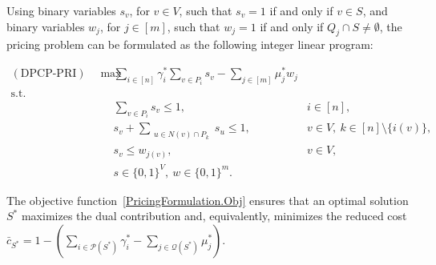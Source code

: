 \documentclass[preprint, 11pt, authoryear]{elsarticle}
\newcommand{\PP}{{\mathcal P}}
\newcommand{\QQ}{{\mathcal Q}}
\newcommand{\R}{{\mathbb R}}
\newcommand{\STAB}{{\mathscr S}}
\newcommand{\setcoveringform}{\text{DPCP-SCF}}
\newcommand{\pricingform}{\text{DPCP-PRI}}
\begin{document}

Using binary variables $s_v$, for $v \in V$, such that $s_v = 1$ if and only if $v \in S$, and binary variables $w_j$, for $j \in [m]$, such that $w_j = 1$ if and only if $Q_j \cap S \neq \emptyset$, the pricing problem can be formulated as the following integer linear program:

{\small
\begin{align}
(\pricingform) \quad \max & \sum_{i \in [n]} \gamma^*_i \sum_{v \in P_i} s_v - \sum_{j \in [m]} \mu^*_j w_j \label{PricingFormulation.Obj}\\[-4pt]
\textrm{s.t.} \nonumber \\[-4pt]
& \sum_{v \in P_i} s_v \leq 1, &  i \in [n], \label{PricingFormulation.A.clique} \\
& s_v + \sum_{\substack{u \in N(v) \cap P_k }} s_u \leq 1, &  v \in V,\ k \in [n] \setminus \{i(v)\}, \label{PricingFormulation.A.edge} \\
& s_v \leq w_{j(v)}, &  v \in V, \label{PricingFormulation.B}  \\
& s \in \{0,1\}^V,\ w \in \{0,1\}^{m}. \nonumber
\end{align}
}


The objective function~\eqref{PricingFormulation.Obj} ensures that an optimal solution $S^*$ maximizes the dual contribution and, equivalently, minimizes the reduced cost $\bar c_{S^*} = 1 - (\sum_{i \in \PP(S^*)} \gamma^*_i - \sum_{j \in \QQ(S^*)} \mu^*_j)$.
\end{document}
